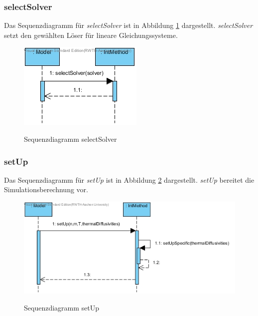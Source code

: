 \subsubsection*{selectSolver}

Das Sequenzdiagramm für \emph{selectSolver} ist in  Abbildung \ref{Sequenzdiagramm selectSolverIntMethod} dargestellt.
\emph{selectSolver} setzt den gewählten Löser für lineare Gleichungssysteme.

\begin{figure}[H]
	\centering
	\includegraphics{Bilder/IntMethod__selectSolver().jpg}\\
	\caption{Sequenzdiagramm selectSolver}
	\label{Sequenzdiagramm selectSolverIntMethod}
\end{figure}

\subsubsection*{setUp}

Das Sequenzdiagramm für \emph{setUp} ist in  Abbildung \ref{Sequenzdiagramm setUp} dargestellt. \emph{setUp} bereitet die Simulationsberechnung vor.

\begin{figure}[H]
	\centering
	\includegraphics[scale=.6]{Bilder/IntMethod__setUp().jpg}\\
	\caption{Sequenzdiagramm setUp}
	\label{Sequenzdiagramm setUp}
\end{figure}

